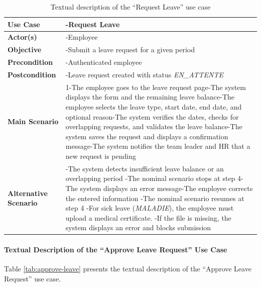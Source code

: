\begin{table}[H]
\centering
\caption{Textual description of the ``Request Leave'' use case}
\label{tab:request-leave}
\begin{tabular}{|p{}|p{}|}
    \hline
   \textbf{Use Case} & -Request Leave \\
    \hline
    \textbf{Actor(s)} & -Employee \\
    \hline
    \textbf{Objective} & -Submit a leave request for a given period \\
    \hline
    \textbf{Precondition} & -Authenticated employee \\
    \hline
    \textbf{Postcondition} & -Leave request created with status \textit{EN\_ATTENTE} \\
    \hline
    \textbf{Main Scenario}
    & 1-The employee goes to the leave request page\newline
2-The system displays the form and the remaining leave balance\newline
3-The employee selects the leave type, start date, end date, and optional reason\newline
4-The system verifies the dates, checks for overlapping requests, and validates the leave balance\newline
5-The system saves the request and displays a confirmation message\newline
6-The system notifies the team leader and HR that a new request is pending \\ \hline
    \textbf{Alternative Scenario}
    & -The system detects insufficient leave balance or an overlapping period\newline
-The nominal scenario stops at step 4\newline
1-The system displays an error message\newline
2-The employee corrects the entered information\newline
-The nominal scenario resumes at step 4\newline
\newline
-For sick leave (\textit{MALADIE}), the employee must upload a medical certificate.\newline
-If the file is missing, the system displays an error and blocks submission \\ \hline
\end{tabular}
\end{table}

\paragraph{Textual Description of the ``Approve Leave Request'' Use Case}
Table \ref{tab:approve-leave} presents the textual description of the ``Approve Leave Request'' use case.

